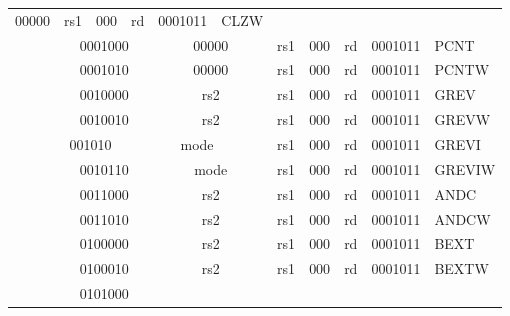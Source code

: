 \begin{table}[p]
\begin{small}
\begin{center}
\begin{tabular}{p{0in}p{0.4in}p{0.05in}p{0.05in}p{0.05in}p{0.05in}p{0.4in}p{0.6in}p{0.4in}p{0.6in}p{0.7in}l}
\multicolumn{2}{c|}{00000} &
\multicolumn{1}{c|}{rs1} &
\multicolumn{1}{c|}{000} &
\multicolumn{1}{c|}{rd} &
\multicolumn{1}{c|}{0001011} & CLZW \\
%
\cline{2-11} &
\multicolumn{4}{|c|}{0001000} &
\multicolumn{2}{c|}{00000} &
\multicolumn{1}{c|}{rs1} &
\multicolumn{1}{c|}{000} &
\multicolumn{1}{c|}{rd} &
\multicolumn{1}{c|}{0001011} & PCNT \\
%
\cline{2-11} &
\multicolumn{4}{|c|}{0001010} &
\multicolumn{2}{c|}{00000} &
\multicolumn{1}{c|}{rs1} &
\multicolumn{1}{c|}{000} &
\multicolumn{1}{c|}{rd} &
\multicolumn{1}{c|}{0001011} & PCNTW \\
%
\cline{2-11} &
\multicolumn{4}{|c|}{0010000} &
\multicolumn{2}{c|}{rs2} &
\multicolumn{1}{c|}{rs1} &
\multicolumn{1}{c|}{000} &
\multicolumn{1}{c|}{rd} &
\multicolumn{1}{c|}{0001011} & GREV \\
%
\cline{2-11} &
\multicolumn{4}{|c|}{0010010} &
\multicolumn{2}{c|}{rs2} &
\multicolumn{1}{c|}{rs1} &
\multicolumn{1}{c|}{000} &
\multicolumn{1}{c|}{rd} &
\multicolumn{1}{c|}{0001011} & GREVW \\
%
\cline{2-11} &
\multicolumn{3}{|c|}{\hphantom{00}001010} &
\multicolumn{3}{c|}{mode} &
\multicolumn{1}{c|}{rs1} &
\multicolumn{1}{c|}{000} &
\multicolumn{1}{c|}{rd} &
\multicolumn{1}{c|}{0001011} & GREVI \\
%
\cline{2-11} &
\multicolumn{4}{|c|}{0010110} &
\multicolumn{2}{c|}{mode} &
\multicolumn{1}{c|}{rs1} &
\multicolumn{1}{c|}{000} &
\multicolumn{1}{c|}{rd} &
\multicolumn{1}{c|}{0001011} & GREVIW \\
%
\cline{2-11} &
\multicolumn{4}{|c|}{0011000} &
\multicolumn{2}{c|}{rs2} &
\multicolumn{1}{c|}{rs1} &
\multicolumn{1}{c|}{000} &
\multicolumn{1}{c|}{rd} &
\multicolumn{1}{c|}{0001011} & ANDC \\
%
\cline{2-11} &
\multicolumn{4}{|c|}{0011010} &
\multicolumn{2}{c|}{rs2} &
\multicolumn{1}{c|}{rs1} &
\multicolumn{1}{c|}{000} &
\multicolumn{1}{c|}{rd} &
\multicolumn{1}{c|}{0001011} & ANDCW \\
%
\cline{2-11} &
\multicolumn{4}{|c|}{0100000} &
\multicolumn{2}{c|}{rs2} &
\multicolumn{1}{c|}{rs1} &
\multicolumn{1}{c|}{000} &
\multicolumn{1}{c|}{rd} &
\multicolumn{1}{c|}{0001011} & BEXT \\
%
\cline{2-11} &
\multicolumn{4}{|c|}{0100010} &
\multicolumn{2}{c|}{rs2} &
\multicolumn{1}{c|}{rs1} &
\multicolumn{1}{c|}{000} &
\multicolumn{1}{c|}{rd} &
\multicolumn{1}{c|}{0001011} & BEXTW \\
%
\cline{2-11} &
\multicolumn{4}{|c|}{0101000} &

\end{tabular}
\end{center}
\end{small}
\end{table}
